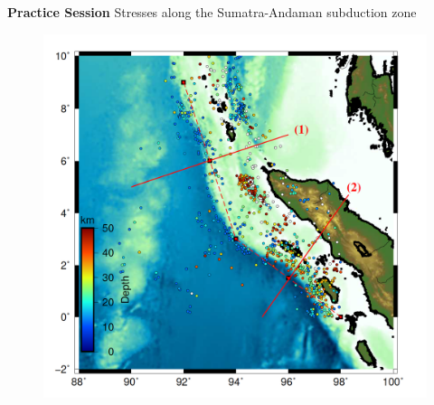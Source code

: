 \documentclass[11pt]{beamer}
\begin{document}
\begin{frame}{\textbf{Practice Session}}
    \large{Stresses along the Sumatra-Andaman subduction zone}
    \begin{figure}
        \includegraphics[width=0.6\linewidth]{images/sumatra}
    \end{figure}
\end{frame}
\end{document}
